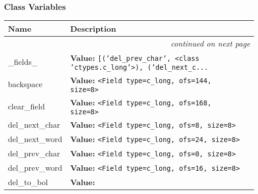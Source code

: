 
  \subsubsection{Class Variables}

    \vspace{-1cm}
\hspace{\varindent}\begin{longtable}{|p{\varnamewidth}|p{\vardescrwidth}|l}
\cline{1-2}
\cline{1-2} \centering \textbf{Name} & \centering \textbf{Description}& \\
\cline{1-2}
\endhead\cline{1-2}\multicolumn{3}{r}{\small\textit{continued on next page}}\\\endfoot\cline{1-2}
\endlastfoot\raggedright \_\-f\-i\-e\-l\-d\-s\-\_\- & \raggedright \textbf{Value:} 
{\tt \texttt{[}\texttt{(}\texttt{'}\texttt{del\_prev\_char}\texttt{'}\texttt{, }{\textless}class 'ctypes.c\_long'{\textgreater}\texttt{)}\texttt{, }\texttt{(}\texttt{'}\texttt{del\_next\_c}\texttt{...}}&\\
\cline{1-2}
\raggedright b\-a\-c\-k\-s\-p\-a\-c\-e\- & \raggedright \textbf{Value:} 
{\tt {\textless}Field type=c\_long, ofs=144, size=8{\textgreater}}&\\
\cline{1-2}
\raggedright c\-l\-e\-a\-r\-\_\-f\-i\-e\-l\-d\- & \raggedright \textbf{Value:} 
{\tt {\textless}Field type=c\_long, ofs=168, size=8{\textgreater}}&\\
\cline{1-2}
\raggedright d\-e\-l\-\_\-n\-e\-x\-t\-\_\-c\-h\-a\-r\- & \raggedright \textbf{Value:} 
{\tt {\textless}Field type=c\_long, ofs=8, size=8{\textgreater}}&\\
\cline{1-2}
\raggedright d\-e\-l\-\_\-n\-e\-x\-t\-\_\-w\-o\-r\-d\- & \raggedright \textbf{Value:} 
{\tt {\textless}Field type=c\_long, ofs=24, size=8{\textgreater}}&\\
\cline{1-2}
\raggedright d\-e\-l\-\_\-p\-r\-e\-v\-\_\-c\-h\-a\-r\- & \raggedright \textbf{Value:} 
{\tt {\textless}Field type=c\_long, ofs=0, size=8{\textgreater}}&\\
\cline{1-2}
\raggedright d\-e\-l\-\_\-p\-r\-e\-v\-\_\-w\-o\-r\-d\- & \raggedright \textbf{Value:} 
{\tt {\textless}Field type=c\_long, ofs=16, size=8{\textgreater}}&\\
\cline{1-2}
\raggedright d\-e\-l\-\_\-t\-o\-\_\-b\-o\-l\- & \raggedright \textbf{Value:} 

\end{longtable}
